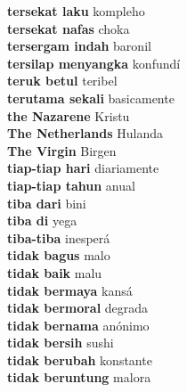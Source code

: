 \textbf{ tersekat laku  } kompleho \\
\textbf{ tersekat nafas  } choka \\
\textbf{ tersergam indah  } baronil \\
\textbf{ tersilap menyangka  } konfundí \\
\textbf{ teruk betul  } teribel \\
\textbf{ terutama sekali  } basicamente \\
\textbf{ the Nazarene  } Kristu \\
\textbf{ The Netherlands  } Hulanda \\
\textbf{ The Virgin  } Birgen \\
\textbf{ tiap-tiap hari  } diariamente \\
\textbf{ tiap-tiap tahun  } anual \\
\textbf{ tiba dari  } bini \\
\textbf{ tiba di  } yega \\
\textbf{ tiba-tiba  } inesperá \\
\textbf{ tidak bagus  } malo \\
\textbf{ tidak baik  } malu \\
\textbf{ tidak bermaya  } kansá \\
\textbf{ tidak bermoral  } degrada \\
\textbf{ tidak bernama  } anónimo \\
\textbf{ tidak bersih  } sushi \\
\textbf{ tidak berubah  } konstante \\
\textbf{ tidak beruntung  } malora \\
